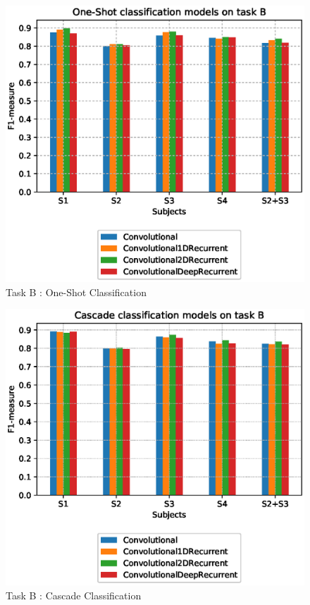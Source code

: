 \begin{figure}[t]
	\centering
	\includegraphics[scale=.4]{figure/B_models_nullclass}
	\caption{Task B : One-Shot Classification}
	\label{fig:B_os}
\end{figure}
\begin{figure}[t]
	\centering
	\includegraphics[scale=.4]{figure/B_models_cascade}
	\caption{Task B : Cascade Classification}
	\label{fig:B_casc}
\end{figure}

